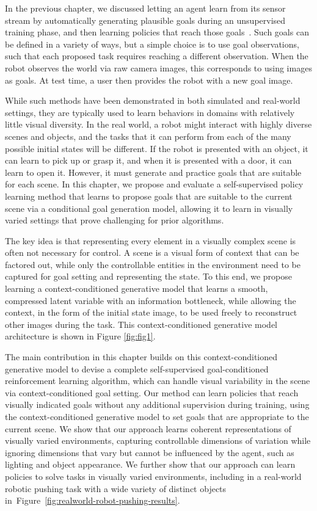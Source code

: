 
In the previous chapter, we discussed letting an agent learn from its sensor stream by automatically generating plausible goals during an unsupervised training phase, and then learning policies that reach those goals~\citep{nair2018rig, nachum2018hiro, wadefarley2019discern, pong2019skewfit}. Such goals can be defined in a variety of ways, but a simple choice is to use goal observations, such that each proposed task requires reaching a different observation. When the robot observes the world via raw camera images, this corresponds to using images as goals. At test time, a user then provides the robot with a new goal image.

While such methods have been demonstrated in both simulated and real-world settings, they are typically used to learn behaviors in domains with relatively little visual diversity.
In the real world, a robot might interact with highly diverse scenes and objects, and the tasks that it can perform from each of the many possible initial states will be different. If the robot is presented with an object, it can learn to pick up or grasp it, and when it is presented with a door, it can learn to open it. However, it must generate and practice goals that are suitable for each scene. In this chapter, we propose and evaluate a self-supervised policy learning method that learns to propose goals that are suitable to the current scene via a conditional goal generation model, allowing it to learn in visually varied settings that prove challenging for prior algorithms.

The key idea is that representing every element in a visually complex scene is often not necessary for control. A scene is a visual form of context that can be factored out, while only the controllable entities in the environment need to be captured for goal setting and representing the state.
To this end, we propose learning a context-conditioned generative model that learns a smooth, compressed latent variable with an information bottleneck, while allowing the context, in the form of the initial state image, to be used freely to reconstruct other images during the task.
This context-conditioned generative model architecture is shown in Figure \ref{fig:fig1}.

The main contribution in this chapter builds on this context-conditioned generative model to devise a complete self-supervised goal-conditioned reinforcement learning algorithm, which can handle visual variability in the scene via context-conditioned goal setting. Our method can learn policies that reach visually indicated goals without any additional supervision during training, using the context-conditioned generative model to set goals that are appropriate to the current scene. We show that our approach learns coherent representations of visually varied environments, capturing controllable dimensions of variation while ignoring dimensions that vary but cannot be influenced by the agent, such as lighting and object appearance. We further show that our approach can learn policies to solve tasks in visually varied environments, including in a real-world robotic pushing task with a wide variety of distinct objects in~Figure~\ref{fig:realworld-robot-pushing-results}.

